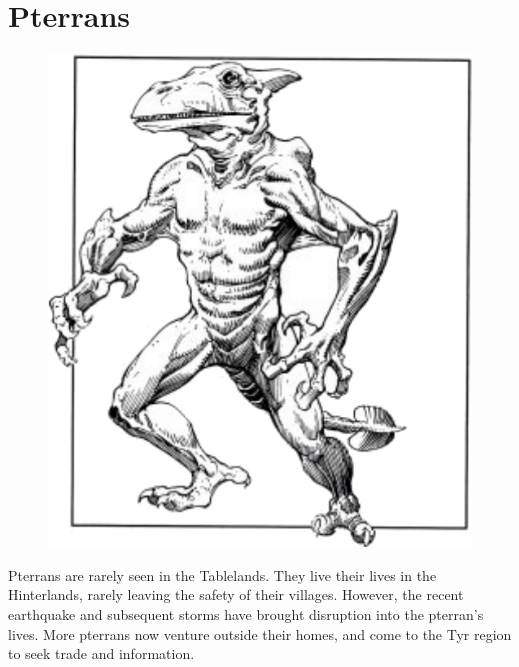 \section{Pterrans}

\begin{figure}[b!]
\centering
\includegraphics[width=\columnwidth]{images/pterran-1.png}
\WOTC
\end{figure}

Pterrans are rarely seen in the Tablelands. They live their lives in the Hinterlands, rarely leaving the safety of their villages. However, the recent earthquake and subsequent storms have brought disruption into the pterran's lives. More pterrans now venture outside their homes, and come to the Tyr region to seek trade and information.

